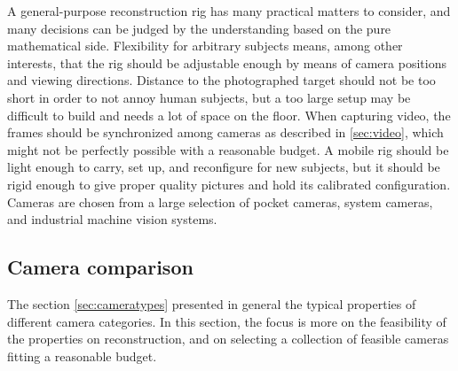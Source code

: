 A general-purpose reconstruction rig has many practical matters to consider, and many decisions can be judged by the understanding based on the pure mathematical side.
Flexibility for arbitrary subjects means, among other interests, that the rig should be adjustable enough by means of camera positions and viewing directions.
Distance to the photographed target should not be too short in order to not annoy human subjects, but a too large setup may be difficult to build and needs a lot of space on the floor.
When capturing video, the frames should be synchronized among cameras as described in \ref{sec:video}, which might not be perfectly possible with a reasonable budget.
A mobile rig should be light enough to carry, set up, and reconfigure for new subjects, but it should be rigid enough to give proper quality pictures and hold its calibrated configuration.
Cameras are chosen from a large selection of pocket cameras, system cameras, and industrial machine vision systems.



\subsection{Camera comparison} \label{sec:cameracomparison} %

The section \ref{sec:cameratypes} presented in general the typical properties of different camera categories.
In this section, the focus is more on the feasibility of the properties on reconstruction, and on selecting a collection of feasible cameras fitting a reasonable budget.

